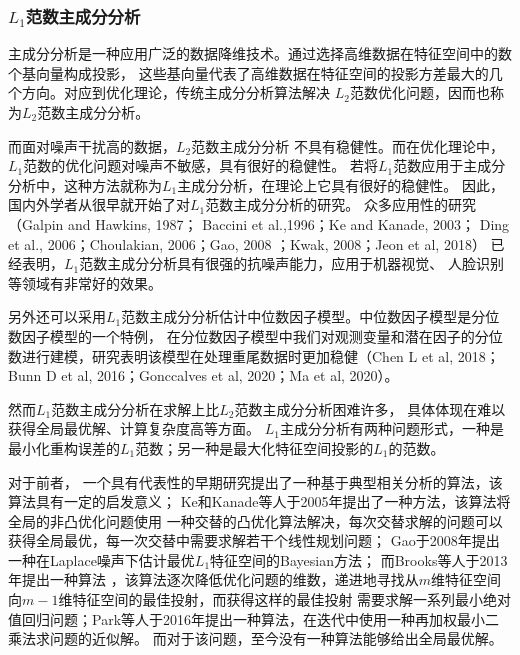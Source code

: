 \subsubsection{$L_1$范数主成分分析}
主成分分析是一种应用广泛的数据降维技术。通过选择高维数据在特征空间中的数个基向量构成投影，
这些基向量代表了高维数据在特征空间的投影方差最大的几个方向。对应到优化理论，传统主成分分析算法解决
$L_2$范数优化问题，因而也称为$L_2$范数主成分分析。

而面对噪声干扰高的数据，$L_2$范数主成分分析
不具有稳健性。而在优化理论中，$L_1$范数的优化问题对噪声不敏感，具有很好的稳健性。
若将$L_1$范数应用于主成分分析中，这种方法就称为$L_1$主成分分析，在理论上它具有很好的稳健性。
因此，国内外学者从很早就开始了对$L_1$范数主成分分析的研究。
众多应用性的研究（Galpin and Hawkins, 1987\cite{galpin1987methods}；
Baccini et al.,1996\cite{baccini1996l1}；Ke and Kanade, 2003\cite{ke2003robust}；
Ding et al., 2006\cite{ding2006r}；Choulakian, 2006\cite{choulakian2006l1}；Gao, 2008\cite{gao2008robust}
；Kwak, 2008\cite{kwak2008principal}；Jeon et al, 2018\cite{jeon2018data}）
已经表明，$L_1$范数主成分分析具有很强的抗噪声能力，应用于机器视觉\cite{ke2005robust}、
人脸识别\cite{kwak2008principal}等领域有非常好的效果。

另外还可以采用$L_1$范数主成分分析估计中位数因子模型。中位数因子模型是分位数因子模型的一个特例，
在分位数因子模型中我们对观测变量和潜在因子的分位数进行建模，研究表明该模型在处理重尾数据时更加稳健（Chen L et al, 2018\cite{chen2018quantile}；
Bunn D et al, 2016\cite{bunn2016analysis}；Gonccalves et al, 2020\cite{gonccalves2020bayesian}；Ma et al, 2020\cite{ma2020estimation}）。

然而$L_1$范数主成分分析在求解上比$L_2$范数主成分分析困难许多，
具体体现在难以获得全局最优解、计算复杂度高等方面。
$L_1$主成分分析有两种问题形式，一种是最小化重构误差的$L_1$范数；另一种是最大化特征空间投影的$L_1$的范数。

对于前者，
一个具有代表性的早期研究\cite{baccini1996l1}提出了一种基于典型相关分析的算法，该算法具有一定的启发意义；
Ke和Kanade等人于2005年提出了一种方法\cite{ke2005robust}，该算法将全局的非凸优化问题使用
一种交替的凸优化算法解决，每次交替求解的问题可以获得全局最优，每一次交替中需要求解若干个线性规划问题；
Gao于2008年提出一种在Laplace噪声下估计最优$L_1$特征空间的Bayesian方法\cite{gao2008robust}；
而Brooks等人于2013年提出一种算法
\cite{brooks2013pure}，该算法逐次降低优化问题的维数，递进地寻找从$m$维特征空间向$m-1$维特征空间的最佳投射，而获得这样的最佳投射
需要求解一系列最小绝对值回归问题；Park等人于2016年提出一种算法\cite{park2016iteratively}，在迭代中使用一种再加权最小二乘法求问题的近似解。
而对于该问题，至今没有一种算法能够给出全局最优解。

